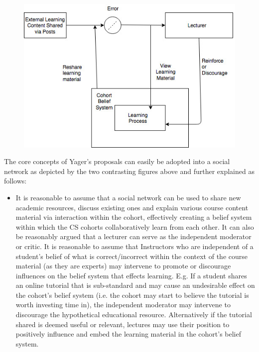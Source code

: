 \begin{itemize}[\null]
\begin{figure}[H]
	\centering
	\includegraphics[scale=0.5]{chapters/chapter02/figures/useCase.jpg}
	\label{fig:UseCaseParticipatory}
\end{figure}

    The core concepts of Yager's proposals can easily be adopted into a social network as depicted by the two contrasting figures above and further explained as follows:
    \begin{itemize}
        \item It is reasonable to assume that a social network can be used to share new academic resources, discuss existing ones and explain various course content material via interaction within the cohort, effectively creating a belief system within which the CS cohorts collaboratively learn from each other. It can also be reasonably argued that a lecturer can serve as the independent moderator or critic. It is reasonable to assume that Instructors who are independent of a student's belief of what is correct/incorrect within the context of the course material (as they are experts) may intervene to promote or discourage influences on the belief system that effects learning. E.g. If a student shares an online tutorial that is sub-standard and may cause an undesirable effect on the cohort's belief system (i.e. the cohort may start to believe the tutorial is worth investing time in), the independent moderator may intervene to discourage the hypothetical educational resource. Alternatively if the tutorial shared is deemed useful or relevant, lectures may use their position to positively influence and embed the learning material in the cohort's belief system.
        

\end{itemize}
\end{itemize}
